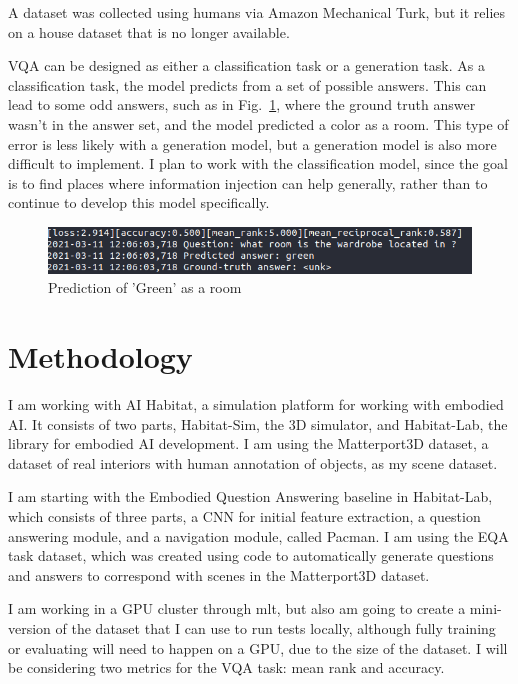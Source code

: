 \documentclass{article}
\begin{document}
A dataset was collected using humans via Amazon Mechanical Turk, but it relies on a house dataset that is no longer available. 

VQA can be designed as either a classification task or a generation task. As a classification task, the model predicts from a set of possible answers. This can lead to some odd answers, such as in Fig.~\ref{fig:Green}, where the ground truth answer wasn't in the answer set, and the model predicted a color as a room. This type of error is less likely with a generation model, but a generation model is also more difficult to implement. I plan to work with the classification model, since the goal is to find places where information injection can help generally, rather than to continue to develop this model specifically. 

\begin{figure}[h]
	\centering
	\includegraphics[width=\textwidth]{../error_images/green_room.png}
	\caption{Prediction of 'Green' as a room}
	\label{fig:Green}
\end{figure}

\section{Methodology}
I am working with AI Habitat, a simulation platform for working with embodied AI\cite{habitat19iccv}. It consists of two parts, Habitat-Sim, the 3D simulator, and Habitat-Lab, the library for embodied AI development. I am using the Matterport3D dataset, a dataset of real interiors with human annotation of objects, as my scene dataset\cite{matterport}.

I am starting with the Embodied Question Answering baseline in Habitat-Lab, which consists of three parts, a CNN for initial feature extraction, a question answering module, and a navigation module, called Pacman\cite{embodiedqa}. I am using the EQA task dataset, which was created using code to automatically generate questions and answers to correspond with scenes in the Matterport3D dataset\cite{eqa_matterport}. 

I am working in a GPU cluster through mlt, but also am going to create a mini-version of the dataset that I can use to run tests locally, although fully training or evaluating will need to happen on a GPU, due to the size of the dataset. I will be considering two metrics for the VQA task: mean rank and accuracy. 
\end{document}

